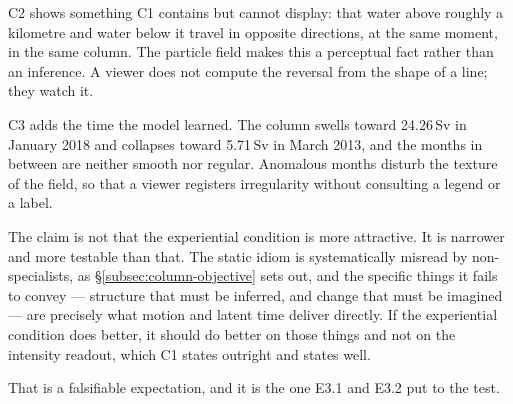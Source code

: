 C2 shows something C1 contains but cannot display: that water above roughly a kilometre and water below it travel in opposite directions, at the same moment, in the same column. The particle field makes this a perceptual fact rather than an inference. A viewer does not compute the reversal from the shape of a line; they watch it.

C3 adds the time the model learned. The column swells toward 24.26\,Sv in January 2018 and collapses toward 5.71\,Sv in March 2013, and the months in between are neither smooth nor regular. Anomalous months disturb the texture of the field, so that a viewer registers irregularity without consulting a legend or a label.

The claim is not that the experiential condition is more attractive. It is narrower and more testable than that. The static idiom is systematically misread by non-specialists, as \S\ref{subsec:column-objective} sets out, and the specific things it fails to convey --- structure that must be inferred, and change that must be imagined --- are precisely what motion and latent time deliver directly. If the experiential condition does better, it should do better on those things and not on the intensity readout, which C1 states outright and states well.

That is a falsifiable expectation, and it is the one E3.1 and E3.2 put to the test.

